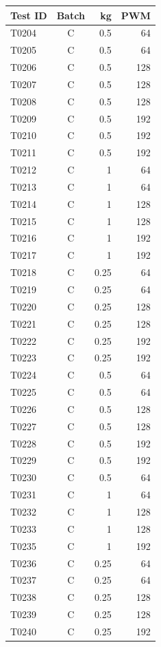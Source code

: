 \documentclass[10pt,letterpaper]{article}
\renewcommand{\arraystretch}{1.15}
\begin{document}
\begin{minipage}[t]{0.48\textwidth}\vspace{0pt}\centering\fontsize{8.5}{9.6}\selectfont
\renewcommand{\arraystretch}{1}\begin{tabular}{lcrr}\toprule Test ID & Batch & kg & PWM\\\midrule
T0204 & C & 0.5 & 64\\
T0205 & C & 0.5 & 64\\
T0206 & C & 0.5 & 128\\
T0207 & C & 0.5 & 128\\
T0208 & C & 0.5 & 128\\
T0209 & C & 0.5 & 192\\
T0210 & C & 0.5 & 192\\
T0211 & C & 0.5 & 192\\
T0212 & C & 1 & 64\\
T0213 & C & 1 & 64\\
T0214 & C & 1 & 128\\
T0215 & C & 1 & 128\\
T0216 & C & 1 & 192\\
T0217 & C & 1 & 192\\
T0218 & C & 0.25 & 64\\
T0219 & C & 0.25 & 64\\
T0220 & C & 0.25 & 128\\
T0221 & C & 0.25 & 128\\
T0222 & C & 0.25 & 192\\
T0223 & C & 0.25 & 192\\
T0224 & C & 0.5 & 64\\
T0225 & C & 0.5 & 64\\
T0226 & C & 0.5 & 128\\
T0227 & C & 0.5 & 128\\
T0228 & C & 0.5 & 192\\
T0229 & C & 0.5 & 192\\
T0230 & C & 0.5 & 64\\
T0231 & C & 1 & 64\\
T0232 & C & 1 & 128\\
T0233 & C & 1 & 128\\
T0235 & C & 1 & 192\\
T0236 & C & 0.25 & 64\\
T0237 & C & 0.25 & 64\\
T0238 & C & 0.25 & 128\\
T0239 & C & 0.25 & 128\\
T0240 & C & 0.25 & 192\\

\end{tabular}
\end{minipage}
\end{document}

